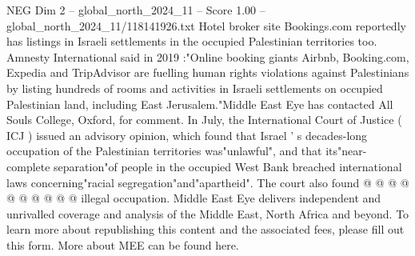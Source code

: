 \begin{textsample}{NEG Dim 2 – global\_north\_2024\_11 – Score 1.00 – global\_north\_2024\_11/118141926.txt}
Hotel broker site Bookings.com reportedly has listings in Israeli settlements in the occupied Palestinian territories too.
Amnesty International said in 2019 :"Online booking giants Airbnb, Booking.com, Expedia and TripAdvisor are fuelling human rights violations against Palestinians by listing hundreds of rooms and activities in Israeli settlements on occupied Palestinian land, including East Jerusalem."Middle East Eye has contacted All Souls College, Oxford, for comment.
In July, the International Court of Justice ( ICJ ) issued an advisory opinion, which found that Israel ' s decades-long occupation of the Palestinian territories was"unlawful", and that its"near-complete separation"of people in the occupied West Bank breached international laws concerning"racial segregation"and"apartheid".
The court also found @ @ @ @ @ @ @ @ @ @ illegal occupation.
Middle East Eye delivers independent and unrivalled coverage and analysis of the Middle East, North Africa and beyond.
To learn more about republishing this content and the associated fees, please fill out this form.
More about MEE can be found here.

\end{textsample}
